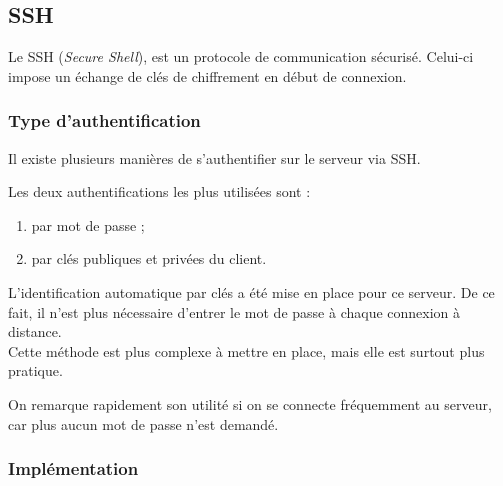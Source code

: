 \subsection{SSH}
\label{subsec:ssh}

Le SSH (\emph{Secure Shell}), est un protocole de communication
sécurisé. Celui-ci impose un échange de clés de chiffrement en début de
connexion.

\subsubsection{Type d'authentification}
\label{subsubsec:type-authentification}

Il existe plusieurs manières de s'authentifier sur le serveur via SSH.

Les deux authentifications les plus utilisées sont :
\begin{enumerate}
\item par mot de passe ;
\item par clés publiques et privées du client.
\end{enumerate}

L'identification automatique par clés a été mise en place pour ce serveur. De ce
fait, il n'est plus nécessaire d'entrer le mot de passe à chaque connexion à
distance. \\
Cette méthode est plus complexe à mettre en place, mais elle est surtout plus
pratique.

On remarque rapidement son utilité si on se connecte fréquemment au serveur, car
plus aucun mot de passe n'est demandé.

\subsubsection{Implémentation}
\label{subsubsec:implementation}

